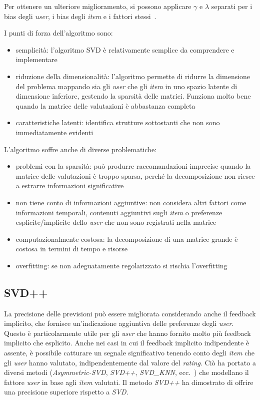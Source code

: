 Per ottenere un ulteriore miglioramento, si possono applicare $\gamma$ e $\lambda$ separati per i bias degli \textit{user}, i bias degli
\textit{item} e i fattori stessi~\cite{SVD_optimized}.

I punti di forza dell'algoritmo sono:

\begin{itemize}
    \item semplicità: l'algoritmo SVD è relativamente semplice da comprendere e implementare
    \item riduzione della dimensionalità: l'algoritmo permette di ridurre la dimensione del problema mappando sia gli \textit{user} che gli \textit{item} in uno spazio latente di dimensione inferiore, gestendo la sparsità delle matrici. Funziona molto bene quando la matrice delle valutazioni è abbastanza completa
    \item caratteristiche latenti: identifica strutture sottostanti che non sono immediatamente evidenti
\end{itemize}

L'algoritmo soffre anche di diverse problematiche:

\begin{itemize}
    \item problemi con la sparsità: può produrre raccomandazioni imprecise quando la matrice delle valutazioni è troppo sparsa, perché la decomposizione non riesce a estrarre informazioni significative
    \item non tiene conto di informazioni aggiuntive: non considera altri fattori come informazioni temporali, contenuti aggiuntivi sugli \textit{item} o preferenze esplicite/implicite dello \textit{user} che non sono registrati nella matrice
    \item computazionalmente costosa: la decomposizione di una matrice grande è costosa in termini di tempo e risorse
    \item overfitting: se non adeguatamente regolarizzato si rischia l'overfitting
\end{itemize}

\subsection{SVD++}\label{svdpp}

La precisione delle previsioni può essere migliorata considerando anche il feedback implicito, che fornisce un'indicazione aggiuntiva delle preferenze degli \textit{user}. Questo è particolarmente utile per gli \textit{user} che hanno fornito molto più feedback implicito che esplicito. Anche nei casi in cui il feedback implicito indipendente è assente, è possibile catturare un segnale significativo tenendo conto degli \textit{item} che gli \textit{user} hanno valutato, indipendentemente dal valore del \textit{rating}. Ciò ha portato a diversi metodi (\textit{Asymmetric-SVD}, \textit{SVD++}, \textit{SVD\_KNN}, ecc.~\cite{SVD++, SVD_KNN}) che modellano il fattore \textit{user} in base agli \textit{item} valutati. Il metodo \textit{SVD++} ha dimostrato di offrire una precisione superiore rispetto a \textit{SVD}.

